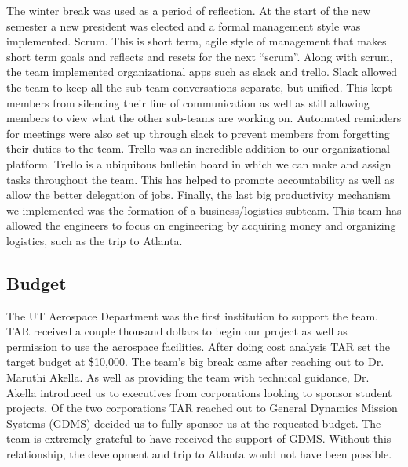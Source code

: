 \documentclass[12pt]{article}
\begin{document}
The winter break was used as a period of reflection. At the start of the new semester a new president was elected and a formal management style was implemented. Scrum. This is short term, agile style of management that makes short term goals and reflects and resets for the next “scrum”. Along with scrum, the team implemented organizational apps such as slack and trello. Slack allowed the team to keep all the sub-team conversations separate, but unified. This kept members from silencing their line of communication as well as still allowing members to view what the other sub-teams are working on. Automated reminders for meetings were also set up through slack to prevent members from forgetting their duties to the team. Trello was an incredible addition to our organizational platform. Trello is a ubiquitous bulletin board in which we can make and assign tasks throughout the team. This has helped to promote accountability as well as allow the better delegation of jobs. Finally, the last big productivity mechanism we implemented was the formation of a business/logistics subteam. This team has allowed the engineers to focus on engineering by acquiring money and organizing logistics, such as the trip to Atlanta. 

\subsection{Budget}
The UT Aerospace Department was the first institution to support the team. TAR received a couple thousand dollars to begin our project as well as permission to use the aerospace facilities. After doing cost analysis TAR set the target budget at \$10,000. The team’s big break came after reaching out to Dr. Maruthi Akella. As well as providing the team with technical guidance, Dr. Akella introduced us to executives from corporations looking to sponsor student projects. Of the two corporations TAR reached out to General Dynamics Mission Systems (GDMS) decided us to fully sponsor us at the requested budget. The team is extremely grateful to have received the support of GDMS. Without this relationship, the development and trip to Atlanta would not have been possible. 
\end{document}

